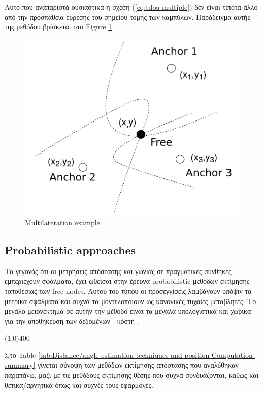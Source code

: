 Αυτό που αναπαριστά ουσιαστικά η σχέση (\ref{eq:tdoa-multiple}) δεν είναι τίποτα άλλο από την προσπάθεια εύρεσης του σημείου τομής των καμπύλων.
Παράδειγμα αυτής της μεθόδου βρίσκεται στο Figure \ref{fig:Multilateration}.

\begin{figure} [H]
	\centering
	\includegraphics[width=0.5\linewidth]{../Photos/multilateration.png}
	\decoRule
	\caption[Multilateration example]{Multilateration example}
	\label{fig:Multilateration}
\end{figure}


\subsection{Probabilistic approaches}
Το γεγονός ότι οι μετρήσεις απόστασης και γωνίας σε πραγματικές συνθήκες εμπεριέχουν σφάλματα, έχει ωθείσαι στην έρευνα 
probabilistic μεθόδων εκτίμησης τοποθεσίας των free nodes. Αυτού του τύπου οι προσεγγίσεις λαμβάνουν υπόψιν τα μετρικά σφάλματα και συχνά τα μοντελοποιούν ως κανονικές
τυχαίες μεταβλητές. Το μεγάλο μειονέκτημα σε αυτήν την μέθοδο είναι τα μεγάλα υπολογιστικά και χωρικά - για την αποθήκευση των δεδομένων - κόστη \cite{wsn-Localization-systems}. 

\vspace{0.9\baselineskip}
\begin{center}
	\line(1,0){400}
\end{center}
\vspace{0.9\baselineskip}

Στο Table \ref{tab:Distance/angle-estimation-techniques-and-position-Computation-summary} γίνεται σύνοψη των μεθόδων εκτίμησης απόστασης
που αναλύθηκαν παραπάνω, μαζί με τις μεθόδους εκτίμησης θέσης που συχνά συνδυάζονται, καθώς και θετικά/αρνητικά όπως και συχνές τους εφαρμογές. 
 
